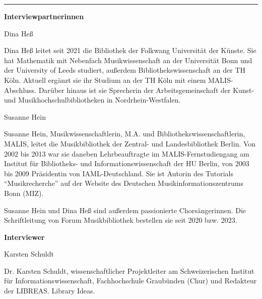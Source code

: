 \begin{center}\rule{0.5\linewidth}{0.5pt}\end{center}

\textbf{Interviewpartnerinnen}

Dina Heß

Dina Heß leitet seit 2021 die Bibliothek der Folkwang Universität der Künste. 
Sie hat Mathematik mit Nebenfach Musikwissenschaft an der Universität Bonn und 
der University of Leeds studiert, außerdem Bibliothekswissenschaft an der TH Köln. 
Aktuell ergänzt sie ihr Studium an der TH Köln mit einem MALIS-Abschluss. Darüber 
hinaus ist sie Sprecherin der Arbeitsgemeinschaft der Kunst- und Musikhochschulbibliotheken 
in Nordrhein-Westfalen.

Susanne Hein

Susanne Hein, Musikwissenschaftlerin, M.A. und Bibliothekswissenschaftlerin, MALIS, 
leitet die Musikbibliothek der Zentral- und Landesbibliothek Berlin. Von 2002 bis 2013 
war sie daneben Lehrbeauftragte im MALIS-Fernstudiengang am Institut für Bibliotheks- und Informationswissenschaft
der HU Berlin, von 2003 bis 2009 Präsidentin von IAML-Deutschland. Sie ist Autorin des Tutorials 
\enquote{Musikrecherche} auf der Website des Deutschen Musikinformationszentrums Bonn (MIZ).

Susanne Hein und Dina Heß sind außerdem passionierte Chorsängerinnen. Die Schriftleitung von Forum 
Musikbibliothek bestellen sie seit 2020 bzw. 2023.

\textbf{Interviewer}

Karsten Schuldt
 
Dr. Karsten Schuldt, wissenschaftlicher Projektleiter am Schweizerischen Institut für Informationswissenschaft,
Fachhochschule Graubünden (Chur) und Redakteur der LIBREAS. Library Ideas.
